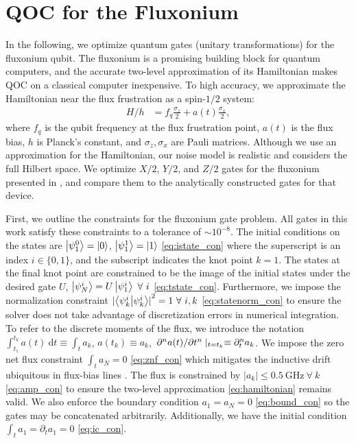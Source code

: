 \section{QOC for the Fluxonium \label{sec:fluxonium}}
In the following, we optimize quantum gates
(unitary transformations) for the fluxonium qubit.
The fluxonium is a promising building block
for quantum computers, and the accurate
two-level approximation of its Hamiltonian makes
QOC on a classical computer inexpensive.
To high accuracy, we approximate the Hamiltonian near the flux frustration
as a spin-$1/2$ system:
\begin{align}
  H/h &= f_{q} \frac{\sigma_{z}}{2} + a(t) \frac{\sigma_{x}}{2},
  \label{eq:hamiltonian}
\end{align}
where $f_{q}$ is the qubit frequency at the flux frustration point,
$a(t)$ is the flux bias, $h$ is Planck's constant, and $\sigma_{z}, \sigma_{x}$
are Pauli matrices. Although we use an approximation for the Hamiltonian,
our noise model is realistic and considers the full Hilbert space. We optimize $X/2$,
$Y/2$, and $Z/2$ gates for the fluxonium presented in \cite{zhang2020universal},
and compare them to the analytically constructed gates for
that device.

First, we outline the constraints for the fluxonium gate problem.
All gates in this work satisfy these constraints to a tolerance
of $\sim 10^{-8}$.
The initial conditions on
the states are $\ket{\psi^{0}_{1}} = \ket{0}$, $\ket{\psi^{1}_{1}} = \ket{1}$
\eqref{eq:istate_con}
where the superscript is an index $i \in \{0, 1\}$,
and the subscript indicates the knot point $k = 1$.
The states at the final knot point are constrained to be
the image of the initial states under the desired gate $U$,
$\ket{\psi^{i}_{N}} = U \ket{\psi^{i}_{1}} \ \forall \ i$
\eqref{eq:tstate_con}.
Furthermore, we impose the normalization constraint
${\lvert \braket{\psi^{i}_{k}}{\psi^{i}_{k}} \rvert}^{2} = 1 \ \forall \ i,k$
\eqref{eq:statenorm_con}
to ensure the solver does not take advantage of discretization errors in numerical integration.
To refer to the discrete moments of the flux, we introduce the notation
$\int^{t_{k}}_{t_{1}} a(t) \ \mathrm{d}t \equiv \int_{t} a_{k}$,
$a(t_{k}) \equiv a_{k}$,
$\pdv*[n]{a(t)}{t} \lvert_{t = t_{k}} \equiv \partial^{n}_{t} a_{k}$.
We impose the zero net flux constraint $\int_{t} a_{N} = 0$
\eqref{eq:znf_con}
which mitigates the inductive drift ubiquitous in flux-bias lines
\cite{battistel2019fast, krantz2019quantum, zhang2020universal}.
The flux is constrained by $\lvert a_{k} \rvert \leq 0.5 \ \textrm{GHz} \ \forall \ k$
\eqref{eq:amp_con}
to ensure the two-level approximation \eqref{eq:hamiltonian} remains valid.
We also enforce the boundary condition $a_{1} = a_{N} = 0$ \eqref{eq:bound_con}
so the gates may be concatenated arbitrarily. Additionally,
we have the initial condition $\int_{t} a_{1} = \partial_{t} a_{1} = 0$
\eqref{eq:ic_con}.

